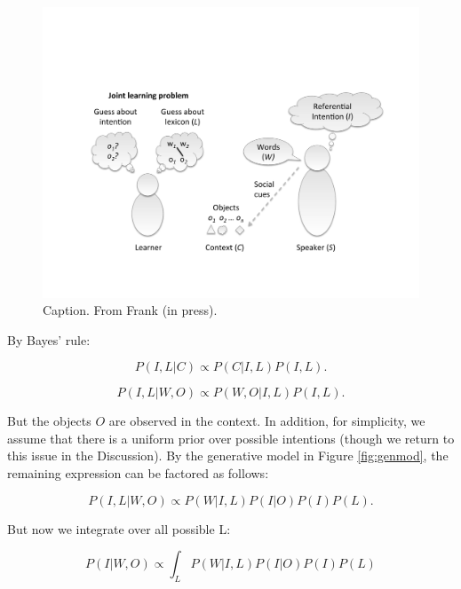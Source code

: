 \documentclass[man,noapacite]{apa2}
\begin{document}
\begin{figure}[tr]
\begin{center}
\includegraphics[width=4.5in]{figures/setup.pdf}
\caption{\label{fig:setup} Caption. From Frank (in press). }
\end{center}
\end{figure}

By Bayes' rule:

\begin{equation}
P( I, L | C) \propto P(C | I, L ) P(I, L).
\end{equation}



\begin{equation}
P( I, L | W, O) \propto P(W, O | I, L) P(I, L).
\end{equation}


\noindent But the objects $O$ are observed in the context. In addition, for simplicity, we assume that there is a uniform prior over possible intentions (though we return to this issue in the Discussion). By the generative model in Figure \ref{fig:genmod}, the remaining expression can be factored as follows:

\begin{equation}
P( I, L | W, O) \propto P(W | I, L) P(I | O) P(I) P(L).
\end{equation}

But now we integrate over all possible L:

\begin{equation}
P( I| W, O) \propto \int_L{P(W | I, L) P(I | O) P(I)  P(L) }
\end{equation}
\end{document}

